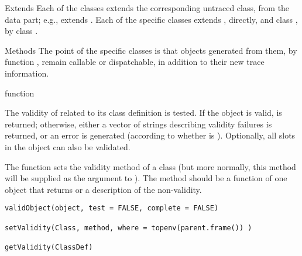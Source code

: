%
\begin{Section}{Extends}
Each of the classes extends the corresponding untraced class, from the
data part; e.g.,  extends .
Each of the specific classes extends , directly,
and class , by class .
\end{Section}
%
\begin{Section}{Methods}
The point of the specific classes is that objects generated from them,
by function , remain callable or dispatchable, in
addition to their new trace information.
\end{Section}
%
\begin{SeeAlso}\relax
 function  
\end{SeeAlso}
%
\begin{Description}\relax
The validity of  related to its class definition is
tested.  If the object is valid,  is returned; otherwise,
either a vector of strings describing validity failures is returned,
or an error is generated (according to whether  is
).  Optionally, all slots in the object can also be validated.

The function  sets the validity method of a class
(but more normally, this method will be supplied as the
 argument to ).  The method
should be a function of one object that returns  or a
description of the non-validity.
\end{Description}
%
\begin{Usage}
\begin{verbatim}
validObject(object, test = FALSE, complete = FALSE)

setValidity(Class, method, where = topenv(parent.frame()) )

getValidity(ClassDef)
\end{verbatim}
\end{Usage}
%
